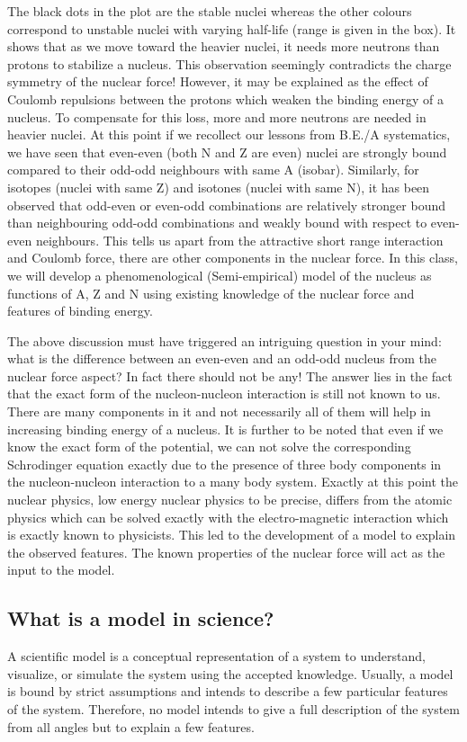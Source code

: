 \documentclass[ebook,12pt,oneside,openany]{memoir}
\begin{document}
    \par The black dots in the plot are the stable nuclei whereas the other colours correspond to unstable nuclei with varying half-life (range is given in the box). It shows that as we move toward the heavier nuclei, it needs more neutrons than protons to stabilize a nucleus. This observation seemingly contradicts the charge symmetry of the nuclear force! However, it may be explained as the effect of Coulomb repulsions between the protons which weaken the binding energy of a nucleus. To compensate for this loss, more and more neutrons are needed in heavier nuclei. At this point if we recollect our lessons from B.E./A systematics, we have seen that even-even (both N and Z are even) nuclei are strongly bound compared to their odd-odd neighbours with same A (isobar). Similarly, for isotopes (nuclei with same Z) and isotones (nuclei with same N), it has been observed that odd-even or even-odd combinations are relatively stronger bound than neighbouring odd-odd combinations and weakly bound with respect to even-even neighbours. This tells us apart from the attractive short range interaction and Coulomb force, there are other components in the nuclear force. In this class, we will develop a phenomenological (Semi-empirical) model of the nucleus as functions of A, Z and N using existing knowledge of the nuclear force and features of binding energy.
    \par The above discussion must have triggered an intriguing question in your mind: what is the difference between an even-even and an odd-odd nucleus from the nuclear force aspect? In fact there should not be any! The answer lies in the fact that the exact form of the nucleon-nucleon interaction is still not known to us. There are many components in it and not necessarily all of them will help in increasing binding energy of a nucleus. It is further to be noted that even if we know the exact form of the potential, we can not solve the corresponding Schrodinger equation exactly due to the presence of three body components in the nucleon-nucleon interaction to a many body system. Exactly at this point the nuclear physics, low energy nuclear physics to be precise, differs from the atomic physics which can be solved exactly with the electro-magnetic interaction which is exactly known to physicists. This led to the development of a model to explain the observed features. The known properties of the nuclear force will act as the input to the model.
    
    
        \subsection{What is a model in science?}
        A scientific model is a conceptual representation of a system to understand, visualize, or simulate the system using the accepted knowledge. Usually, a model is bound by strict assumptions and intends to describe a few particular features of the system. Therefore, no model intends to give a full description of the system from all angles but to explain a few features. 
\end{document}
